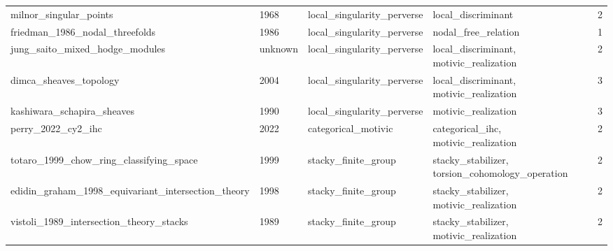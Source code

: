\begin{table}[h]
\begin{tabular}{|p{}|p{}|p{}|p{}|p{}|}
milnor\_\allowbreak{}singular\_\allowbreak{}points & 1968 & local\_\allowbreak{}singularity\_\allowbreak{}perverse & local\_\allowbreak{}discriminant & 2 \\
friedman\_\allowbreak{}1986\_\allowbreak{}nodal\_\allowbreak{}threefolds & 1986 & local\_\allowbreak{}singularity\_\allowbreak{}perverse & nodal\_\allowbreak{}free\_\allowbreak{}relation & 1 \\
jung\_\allowbreak{}saito\_\allowbreak{}mixed\_\allowbreak{}hodge\_\allowbreak{}modules & unknown & local\_\allowbreak{}singularity\_\allowbreak{}perverse & local\_\allowbreak{}discriminant, motivic\_\allowbreak{}realization & 2 \\
dimca\_\allowbreak{}sheaves\_\allowbreak{}topology & 2004 & local\_\allowbreak{}singularity\_\allowbreak{}perverse & local\_\allowbreak{}discriminant, motivic\_\allowbreak{}realization & 3 \\
kashiwara\_\allowbreak{}schapira\_\allowbreak{}sheaves & 1990 & local\_\allowbreak{}singularity\_\allowbreak{}perverse & motivic\_\allowbreak{}realization & 3 \\
perry\_\allowbreak{}2022\_\allowbreak{}cy2\_\allowbreak{}ihc & 2022 & categorical\_\allowbreak{}motivic & categorical\_\allowbreak{}ihc, motivic\_\allowbreak{}realization & 2 \\
totaro\_\allowbreak{}1999\_\allowbreak{}chow\_\allowbreak{}ring\_\allowbreak{}classifying\_\allowbreak{}space & 1999 & stacky\_\allowbreak{}finite\_\allowbreak{}group & stacky\_\allowbreak{}stabilizer, torsion\_\allowbreak{}cohomology\_\allowbreak{}operation & 2 \\
edidin\_\allowbreak{}graham\_\allowbreak{}1998\_\allowbreak{}equivariant\_\allowbreak{}intersection\_\allowbreak{}theory & 1998 & stacky\_\allowbreak{}finite\_\allowbreak{}group & stacky\_\allowbreak{}stabilizer, motivic\_\allowbreak{}realization & 2 \\
vistoli\_\allowbreak{}1989\_\allowbreak{}intersection\_\allowbreak{}theory\_\allowbreak{}stacks & 1989 & stacky\_\allowbreak{}finite\_\allowbreak{}group & stacky\_\allowbreak{}stabilizer, motivic\_\allowbreak{}realization & 2 \\
\hline
\end{tabular}
\end{table}
